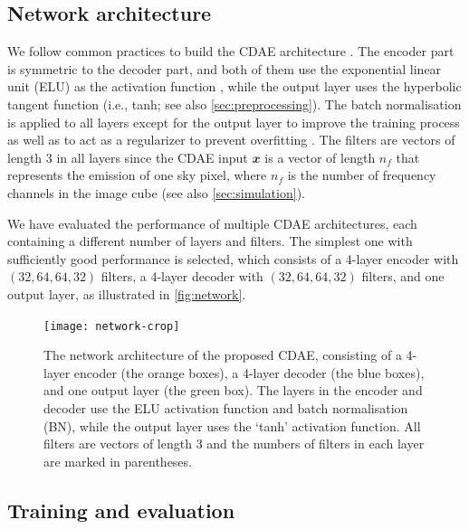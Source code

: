 \documentclass[fleqn,usenatbib]{mnras}
\newcommand{\B}[1]{\mathbfit{#1}}
\begin{document}
\subsection{Network architecture}
\label{sec:architecture}

We follow common practices to build the CDAE architecture
\citep[e.g.,][]{suganuma2018,geron2017}.
The encoder part is symmetric to the decoder part, and both of them
use the exponential linear unit (ELU) as the activation function
\citep{clevert2016},
while the output layer uses the hyperbolic tangent function
(i.e., tanh; see also \autoref{sec:preprocessing}).
The batch normalisation is applied to all layers except for the output
layer to improve the training process as well as to act as a regularizer
to prevent overfitting \citep{ioffe2015}.
The filters are vectors of length 3 in all layers
since the CDAE input $\B{x}$ is a vector of length $n_f$ that represents
the emission of one sky pixel, where $n_f$ is the number of frequency
channels in the image cube (see also \autoref{sec:simulation}).

We have evaluated the performance of multiple CDAE architectures, each
containing a different number of layers and filters.
The simplest one with sufficiently good performance is selected,
which consists of a 4-layer encoder with $(32,64,64,32)$ filters,
a 4-layer decoder with $(32,64,64,32)$ filters, and one output layer,
as illustrated in \autoref{fig:network}.

\begin{figure}
  \centering
  \texttt{[image: network-crop]}
  \caption{\label{fig:network}%
    The network architecture of the proposed CDAE, consisting of a
    4-layer encoder (the orange boxes), a 4-layer decoder (the blue
    boxes), and one output layer (the green box).
    The layers in the encoder and decoder use the ELU activation
    function and batch normalisation (BN), while the output layer uses
    the `tanh' activation function.
    All filters are vectors of length 3 and the numbers of filters in
    each layer are marked in parentheses.
  }
\end{figure}


\subsection{Training and evaluation}
\label{sec:train-eval}
\end{document}
